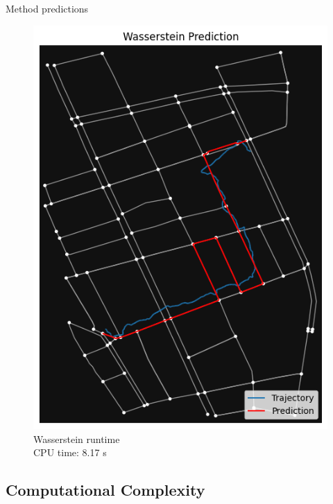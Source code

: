 \documentclass[aspectratio=169, bigfiles, professionalfonts, hyperref={colorlinks=true, allcolors=., urlcolor=blue}]{beamer}
\begin{document}
\begin{frame}{Method predictions}
\begin{figure}[ht]
\begin{minipage}{0.24\linewidth}
\includegraphics[width=\textwidth]{Jupyter Notebook LaTeX/wassersteinsendai.png}
\\\scriptsize{Wasserstein runtime\\
CPU time: 8.17 s}
\end{minipage}
\end{figure}
\end{frame}


\subsection{Computational Complexity}
\end{document}
